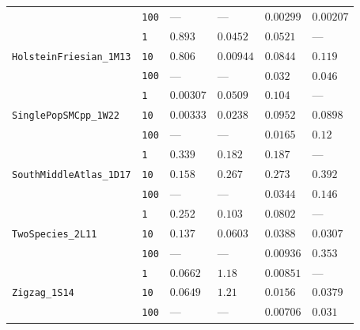\begin{footnotesize}
\begin{tabular}{llllll}
 & \texttt{100} & --- & --- & $0.00299$ & $0.00207$ \\
\cline{1-6}
\multirow[c]{3}{*}{\texttt{HolsteinFriesian\_1M13}} & \texttt{1} & $0.893$ & $0.0452$ & $0.0521$ & --- \\
 & \texttt{10} & $0.806$ & $0.00944$ & $0.0844$ & $0.119$ \\
 & \texttt{100} & --- & --- & $0.032$ & $0.046$ \\
\cline{1-6}
\multirow[c]{3}{*}{\texttt{SinglePopSMCpp\_1W22}} & \texttt{1} & $0.00307$ & $0.0509$ & $0.104$ & --- \\
 & \texttt{10} & $0.00333$ & $0.0238$ & $0.0952$ & $0.0898$ \\
 & \texttt{100} & --- & --- & $0.0165$ & $0.12$ \\
\cline{1-6}
\multirow[c]{3}{*}{\texttt{SouthMiddleAtlas\_1D17}} & \texttt{1} & $0.339$ & $0.182$ & $0.187$ & --- \\
 & \texttt{10} & $0.158$ & $0.267$ & $0.273$ & $0.392$ \\
 & \texttt{100} & --- & --- & $0.0344$ & $0.146$ \\
\cline{1-6}
\multirow[c]{3}{*}{\texttt{TwoSpecies\_2L11}} & \texttt{1} & $0.252$ & $0.103$ & $0.0802$ & --- \\
 & \texttt{10} & $0.137$ & $0.0603$ & $0.0388$ & $0.0307$ \\
 & \texttt{100} & --- & --- & $0.00936$ & $0.353$ \\
\cline{1-6}
\multirow[c]{3}{*}{\texttt{Zigzag\_1S14}} & \texttt{1} & $0.0662$ & $1.18$ & $0.00851$ & --- \\
 & \texttt{10} & $0.0649$ & $1.21$ & $0.0156$ & $0.0379$ \\
 & \texttt{100} & --- & --- & $0.00706$ & $0.031$ \\
\cline{1-6}
\bottomrule
\end{tabular}
\end{footnotesize}
